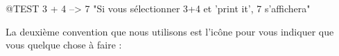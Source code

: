 \documentclass[a4paper,10pt,twoside]{book}
\begin{document}
\begin{code}{@TEST}
3 + 4 --> 7    "Si vous s\'electionner 3+4 et 'print it', 7 s'affichera"
\end{code}

La deuxi\`eme convention que nous utilisons est l'ic\^one \dothisicon{} pour vous indiquer que vous quelque chose \`a faire : 










\end{document}
